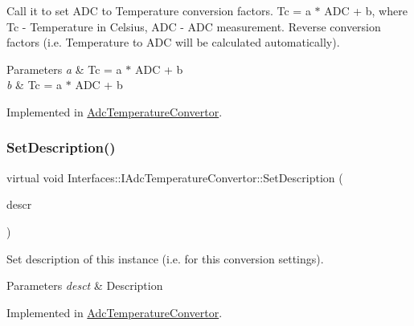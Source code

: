 Call it to set A\+DC to Temperature conversion factors. Tc = a $\ast$ A\+DC + b, where Tc -\/ Temperature in Celsius, A\+DC -\/ A\+DC measurement. Reverse conversion factors (i.\+e. Temperature to A\+DC will be calculated automatically). 


\begin{DoxyParams}{Parameters}
{\em a} & Tc = a $\ast$ A\+DC + b \\
\hline
{\em b} & Tc = a $\ast$ A\+DC + b \\
\hline
\end{DoxyParams}


Implemented in \hyperlink{class_adc_temperature_convertor_a4850843e55992608213cc9cf82d36830}{Adc\+Temperature\+Convertor}.

\mbox{\label{class_interfaces_1_1_i_adc_temperature_convertor_a65bbef2300e21c495d95305921ddb74b}} 
\subsubsection{\texorpdfstring{Set\+Description()}{SetDescription()}}
{\footnotesize\ttfamily virtual void Interfaces\+::\+I\+Adc\+Temperature\+Convertor\+::\+Set\+Description (\begin{DoxyParamCaption}\item[{Q\+String}]{descr }\end{DoxyParamCaption})\hspace{0.3cm}{\ttfamily [pure virtual]}}



Set description of this instance (i.\+e. for this conversion settings). 


\begin{DoxyParams}{Parameters}
{\em desct} & Description \\
\hline
\end{DoxyParams}


Implemented in \hyperlink{class_adc_temperature_convertor_a56103443d7da4769339ddb685a0a8df0}{Adc\+Temperature\+Convertor}.

\mbox{\label{class_interfaces_1_1_i_adc_temperature_convertor_ab5d3453ecc41848b723a790fe7e01f79}} 
